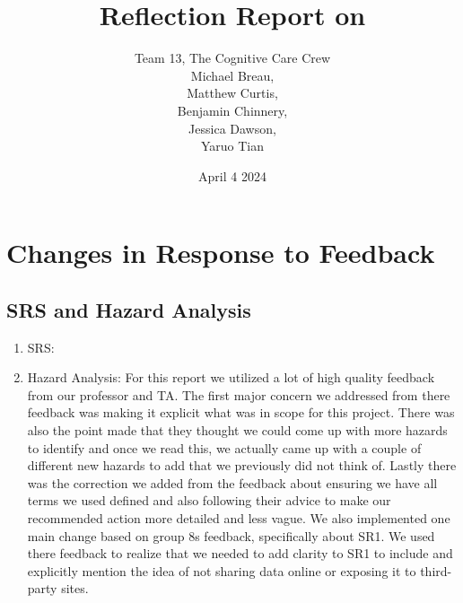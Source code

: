 \documentclass{article}
\title{Reflection Report on \progname}
\author{Team 13, The Cognitive Care Crew
\\Michael Breau, \\Matthew Curtis, \\Benjamin Chinnery, \\Jessica Dawson, \\Yaruo Tian}
\date{April 4 2024}
\begin{document}
\maketitle




\section{Changes in Response to Feedback}










\subsection{SRS and Hazard Analysis}


\begin{enumerate}
   \item SRS:
   \item Hazard Analysis:
       For this report we utilized a lot of high quality feedback from our professor and TA. The first major concern we
       addressed from there feedback was making it explicit what was in scope for this project. There was also the point
       made that they thought we could come up with more hazards to identify and once we read this, we actually came up
       with a couple of different new hazards to add that we previously did not think of. Lastly there was the correction
       we added from the feedback about ensuring we have all terms we used defined and also following their advice to make
       our recommended action more detailed and less vague. We also implemented one main change based on group 8s feedback,
       specifically about SR1. We used there feedback to realize that we needed to add clarity to SR1 to include and explicitly
       mention the idea of not sharing data online or exposing it to third-party sites.
   \end{enumerate}
\end{document}

